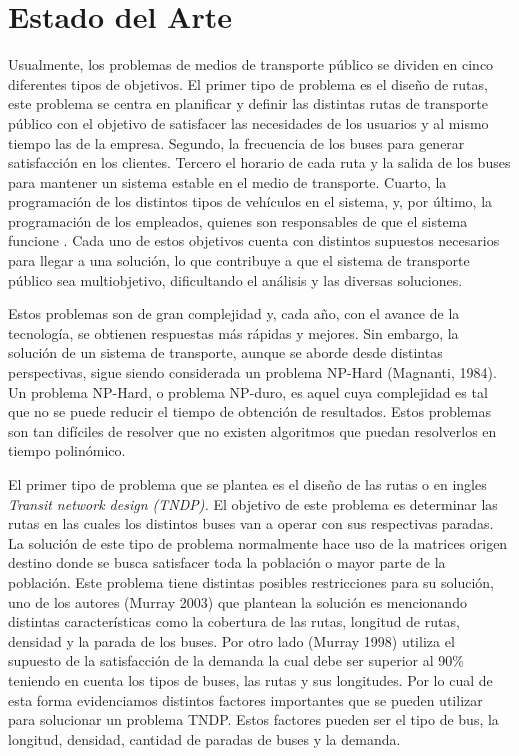 \documentclass[preprint,11pt]{elsarticle}
\begin{document}
\section{Estado del Arte}
\vspace{-1mm}
\label{Int}
Usualmente, los problemas de medios de transporte público se dividen en cinco diferentes tipos de objetivos. El primer tipo de problema es el diseño de rutas, este problema se centra en planificar y definir las distintas rutas de transporte público con el objetivo de satisfacer las necesidades de los usuarios y al mismo tiempo las de la empresa. Segundo, la frecuencia de los buses para generar satisfacción en los clientes. Tercero el horario de cada ruta y la salida de los buses para mantener un sistema estable en el medio de transporte. Cuarto, la programación de los distintos tipos de vehículos en el sistema, y, por último, la programación de los empleados, quienes son responsables de que el sistema funcione . Cada uno de estos objetivos cuenta con distintos supuestos necesarios para llegar a una solución, lo que contribuye a que el sistema de transporte público sea multiobjetivo, dificultando el análisis y las diversas soluciones.

Estos problemas son de gran complejidad y, cada año, con el avance de la tecnología, se obtienen respuestas más rápidas y mejores. Sin embargo, la solución de un sistema de transporte, aunque se aborde desde distintas perspectivas, sigue siendo considerada un problema NP-Hard (Magnanti, 1984)\cite{magnanti1984}. Un problema NP-Hard, o problema NP-duro, es aquel cuya complejidad es tal que no se puede reducir el tiempo de obtención de resultados. Estos problemas son tan difíciles de resolver que no existen algoritmos que puedan resolverlos en tiempo polinómico.

El primer tipo de problema que se plantea es el diseño de las rutas o en ingles \textit{Transit network design (TNDP). }El objetivo de este problema es determinar las rutas en las cuales los distintos buses van a operar con sus respectivas paradas. La solución de este tipo de problema normalmente hace uso de la matrices origen destino donde se busca satisfacer toda la población o mayor parte de la población. Este problema tiene distintas posibles restricciones para su solución, uno de los autores (Murray 2003) \cite{murray2003}  que plantean la solución es mencionando distintas características como la cobertura de las rutas, longitud de rutas, densidad y la parada de los buses. Por otro lado (Murray 1998)  \cite{murray1998} utiliza el supuesto de la satisfacción de la demanda la cual debe ser superior al 90\% teniendo en cuenta los tipos de buses, las rutas y sus longitudes. Por lo cual de esta forma evidenciamos distintos factores importantes que se pueden utilizar para solucionar un problema TNDP. Estos factores pueden ser el tipo de bus, la longitud, densidad, cantidad de paradas de buses y la demanda. 
\end{document}
